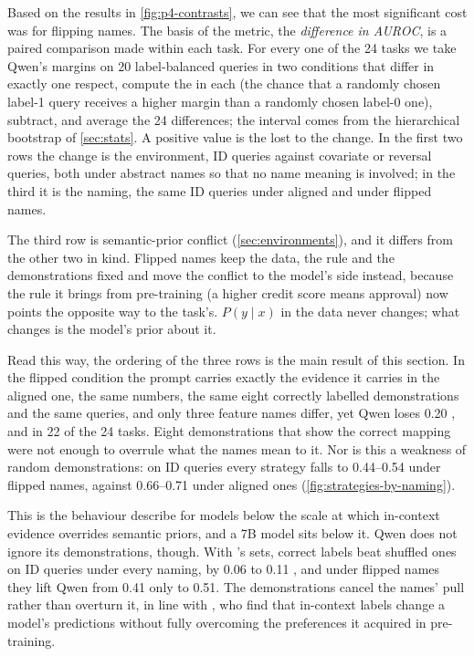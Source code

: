 
Based on the results in \autoref{fig:p4-contrasts}, we can see that the most significant cost was for flipping names. The basis of the metric, the \emph{difference in AUROC}, is a paired comparison made within each task. For every one of the 24 tasks we take Qwen's margins on 20 label-balanced queries in two conditions that differ in exactly one respect, compute the \AUROC in each (the chance that a randomly chosen label-1 query receives a higher margin than a randomly chosen label-0 one), subtract, and average the 24 differences; the interval comes from the hierarchical bootstrap of \autoref{sec:stats}. A positive value is the \AUROC lost to the change. In the first two rows the change is the environment, ID queries against covariate or reversal queries, both under abstract names so that no name meaning is involved; in the third it is the naming, the same ID queries under aligned and under flipped names.

The third row is semantic-prior conflict (\autoref{sec:environments}), and it differs from the other two in kind. Flipped names keep the data, the rule and the demonstrations fixed and move the conflict to the model's side instead, because the rule it brings from pre-training (a higher credit score means approval) now points the opposite way to the task's. $P(y \mid x)$ in the data never changes; what changes is the model's prior about it.

Read this way, the ordering of the three rows is the main result of this section. In the flipped condition the prompt carries exactly the evidence it carries in the aligned one, the same numbers, the same eight correctly labelled demonstrations and the same queries, and only three feature names differ, yet Qwen loses 0.20 \AUROC, and in 22 of the 24 tasks. Eight demonstrations that show the correct mapping were not enough to overrule what the names mean to it. Nor is this a weakness of random demonstrations: on ID queries every strategy falls to 0.44--0.54 under flipped names, against 0.66--0.71 under aligned ones (\autoref{fig:strategies-by-naming}).

This is the behaviour \citet{wei2023larger} describe for models below the scale at which in-context evidence overrides semantic priors, and a 7B model sits below it. Qwen does not ignore its demonstrations, though. With 's sets, correct labels beat shuffled ones on ID queries under every naming, by 0.06 to 0.11 \AUROC, and under flipped names they lift Qwen from 0.41 only to 0.51. The demonstrations cancel the names' pull rather than overturn it, in line with \citet{kossen2024incontext}, who find that in-context labels change a model's predictions without fully overcoming the preferences it acquired in pre-training.

